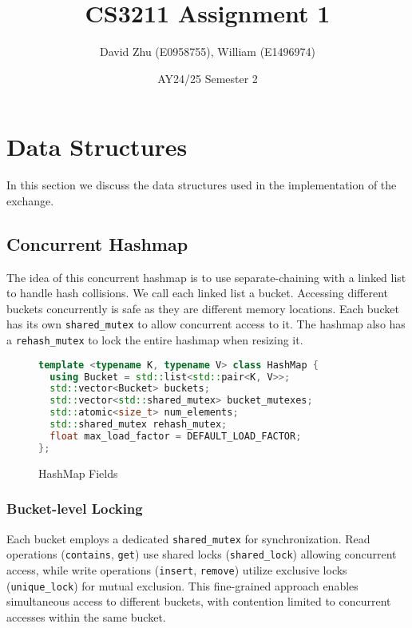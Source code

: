 \documentclass[11pt]{article}
\title{CS3211 Assignment 1}
\author{David Zhu (E0958755), William (E1496974)}
\date{AY24/25 Semester 2}
\begin{document}
\maketitle

\section{Data Structures}\label{sec:Data Structures} %

In this section we discuss the data structures used in the implementation of the exchange.

\subsection{Concurrent Hashmap}\label{sub:Concurrent Hashmap} %

The idea of this concurrent hashmap is to use separate-chaining with a linked list to handle hash
collisions. We call each linked list a bucket. Accessing different buckets concurrently is safe
as they are different memory locations. Each bucket has its own \texttt{shared\_mutex} to
allow concurrent access to it. The hashmap also has a \texttt{rehash\_mutex} to lock the entire
hashmap when resizing it.

\begin{figure}[H]
    \begin{center}
\begin{lstlisting}[language=c++]
template <typename K, typename V> class HashMap {
  using Bucket = std::list<std::pair<K, V>>;
  std::vector<Bucket> buckets;
  std::vector<std::shared_mutex> bucket_mutexes;
  std::atomic<size_t> num_elements;
  std::shared_mutex rehash_mutex;
  float max_load_factor = DEFAULT_LOAD_FACTOR;
};
\end{lstlisting}
    \end{center}
    \caption{HashMap Fields}\label{imp:fig:HashMapFields}
\end{figure}

\subsubsection{Bucket-level Locking}
Each bucket employs a dedicated \texttt{shared\_mutex} for synchronization. Read operations (\texttt{contains}, \texttt{get}) use shared locks (\texttt{shared\_lock}) allowing concurrent access, while write operations (\texttt{insert}, \texttt{remove}) utilize exclusive locks (\texttt{unique\_lock}) for mutual exclusion. This fine-grained approach enables simultaneous access to different buckets, with contention limited to concurrent accesses within the same bucket.
\end{document}
